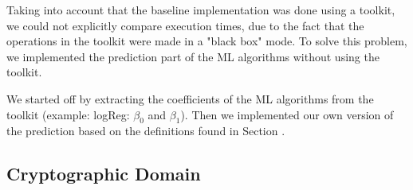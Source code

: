 Taking into account that the baseline implementation was done using a toolkit, we could not explicitly compare execution times, due to the fact that the operations in the toolkit were made in a "black box" mode. To solve this problem, we implemented the prediction part of the \ac{ML} algorithms without using the toolkit.

We started off by extracting the coefficients of the \ac{ML} algorithms from the toolkit (example: logReg: $\beta_{0}$ and $\beta_{1}$). Then we implemented our own version of the prediction based on the definitions found in Section .







\subsection{Cryptographic Domain}
\label{subsec:CryptoDomainImplementation}



